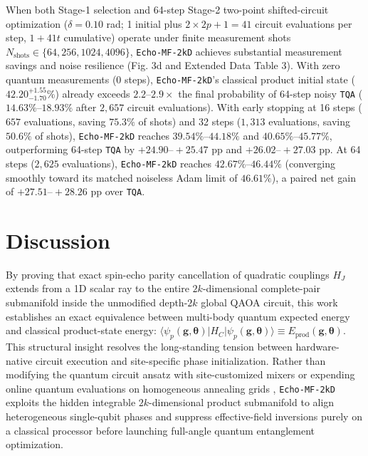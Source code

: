 \documentclass[10pt,a4paper]{article}
\begin{document}
When both Stage-1 selection and 64-step Stage-2 two-point shifted-circuit optimization ($\delta = 0.10$ rad; 1 initial plus $2 \times 2p + 1 = 41$ circuit evaluations per step, $1 + 41t$ cumulative) operate under finite measurement shots $N_{\mathrm{shots}} \in \{64, 256, 1024, 4096\}$, \texttt{Echo-MF-2kD} achieves substantial measurement savings and noise resilience (Fig. 3d and Extended Data Table 3). With zero quantum measurements (0 steps), \texttt{Echo-MF-2kD}'s classical product initial state ($\mathbf{42.20}^{+1.55}_{-1.70}\%$) already exceeds $2.2\mbox{--}2.9\times$ the final probability of 64-step noisy \texttt{TQA} ($14.63\%\mbox{--}18.93\%$ after $2{,}657$ circuit evaluations). With early stopping at 16 steps ($657$ evaluations, saving $75.3\%$ of shots) and 32 steps ($1{,}313$ evaluations, saving $50.6\%$ of shots), \texttt{Echo-MF-2kD} reaches $39.54\%\mbox{--}44.18\%$ and $40.65\%\mbox{--}45.77\%$, outperforming 64-step \texttt{TQA} by $\mathbf{+24.90\mbox{--}{+}25.47}$ pp and $\mathbf{+26.02\mbox{--}{+}27.03}$ pp. At 64 steps ($2{,}625$ evaluations), \texttt{Echo-MF-2kD} reaches $\mathbf{42.67}\%\mbox{--}\mathbf{46.44}\%$ (converging smoothly toward its matched noiseless Adam limit of $46.61\%$), a paired net gain of $\mathbf{+27.51\mbox{--}{+}28.26}$ pp over \texttt{TQA}.


\section*{Discussion}

By proving that exact spin-echo parity cancellation of quadratic couplings $H_J$ extends from a 1D scalar ray to the entire $2k$-dimensional complete-pair submanifold inside the unmodified depth-$2k$ global QAOA circuit, this work establishes an exact equivalence between multi-body quantum expected energy and classical product-state energy: $\langle\psi_p(\boldsymbol{g},\boldsymbol{\theta})|H_C|\psi_p(\boldsymbol{g},\boldsymbol{\theta})\rangle \equiv E_{\mathrm{prod}}(\boldsymbol{g},\boldsymbol{\theta})$. This structural insight resolves the long-standing tension between hardware-native circuit execution and site-specific phase initialization. Rather than modifying the quantum circuit ansatz with site-customized mixers \citep{egger2021warm,tate2023warm} or expending online quantum evaluations on homogeneous annealing grids \citep{sack2021quantum}, \texttt{Echo-MF-2kD} exploits the hidden integrable $2k$-dimensional product submanifold to align heterogeneous single-qubit phases and suppress effective-field inversions purely on a classical processor before launching full-angle quantum entanglement optimization.
\end{document}
